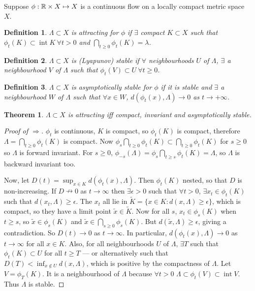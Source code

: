 \documentclass{notes}
\theoremstyle{plain}
\newtheorem*{theorem}{Theorem}
\newtheorem*{definition}{Definition}
\DeclareMathOperator{\inter}{int}
\begin{document}
Suppose $\phi : \mathbb{R} \times X \mapsto X$ is a continuous flow on a locally
compact metric space $X$.

\begin{definition}
$\Lambda \subset X$ is attracting for $\phi$ if $\exists$ compact
$K \subset X$ such that $\phi_t(K) \subset \inter K\ \forall t>0$
and $\bigcap_{t \ge 0} \phi_t(K) = \lambda$.
\end{definition}

\begin{definition}
$\Lambda \subset X$ is (Lyapunov) stable if $\forall$ neighbourhoods
$U$ of $\Lambda$, $\exists$ a neighbourhood $V$ of $\Lambda$ such that
$\phi_t(V) \subset U\ \forall t \ge 0$.
\end{definition}

\begin{definition}
$\Lambda \subset X$ is asymptotically stable for $\phi$ if it is stable
and $\exists$ a neighbourhood $W$ of $\Lambda$ such that $\forall x \in W$,
$d(\phi_t(x),\Lambda) \to 0$ as $t \to +\infty$.
\end{definition}

\begin{theorem}
$\Lambda \subset X$ is attracting iff compact, invariant and asymptotically
stable.
\end{theorem}

\begin{proof}[Proof of $\Rightarrow$]
$\phi_t$ is continuous, $K$ is compact, so $\phi_t(K)$ is compact,
therefore $\Lambda = \bigcap_{t \ge 0} \phi_t(K)$ is compact.  Now
$\phi_s \bigcap_{t \ge 0} \phi_t(K) \subset \bigcap_{t \ge 0} \phi_t(K)$
for $s \ge 0$ so $\Lambda$ is forward invariant.  For $s \ge 0$,
$\phi_{-s}(\Lambda) = \phi_s \bigcap_{t \ge s} \phi_t(K) = \Lambda$,
so $\Lambda$ is backward invariant too.

Now, let $D(t) = \sup_{x \in K} d(\phi_t(x),\Lambda)$.  Then
$\phi_t(K)$ nested, so that $D$ is non-increasing.  If $D \nrightarrow
0$ as $t \to \infty$ then $\exists \epsilon >0$ such that $\forall t > 0$,
$\exists x_t \in \phi_t(K)$ such that $d(x_t,\Lambda) \ge \epsilon$.  The
$x_t$ all lie in $\tilde{K} = \{ x \in K : d(x,\Lambda) \ge \epsilon \}$,
which is compact, so they have a limit point $\tilde{x} \in \tilde{K}$.
Now for all $s$, $x_t \in \phi_s(K)$ when $t \ge s$, so $\tilde{x} \in
\phi_s(K)$ and $\tilde{x} \in \bigcap_{s \ge 0} \phi_s(K)$.  But
$d(\tilde{x},\Lambda) \ge \epsilon$, giving a contradiction.  So $D(t) \to
0$ as $t \to \infty$.  In particular, $d(\phi_t(x),\Lambda) \to 0$
as $t \to \infty$ for all $x \in K$.  Also, for all neighbourhoods
$U$ of $\Lambda$, $\exists T$ such that $\phi_t(K) \subset U$ for all
$t \ge T$ --- or alternatively such that $D(T) < \inf_{x \notin U}
d(x,\Lambda)$, which is positive by the compactness of $\Lambda$.  Let
$V = \phi_T(K)$.  It is a neighbourhood of $\Lambda$ because $\forall t > 0$
$\Lambda \subset \phi_t(V) \subset \inter V$.  Thus $\Lambda$ is stable.
\end{proof}
\end{document}
